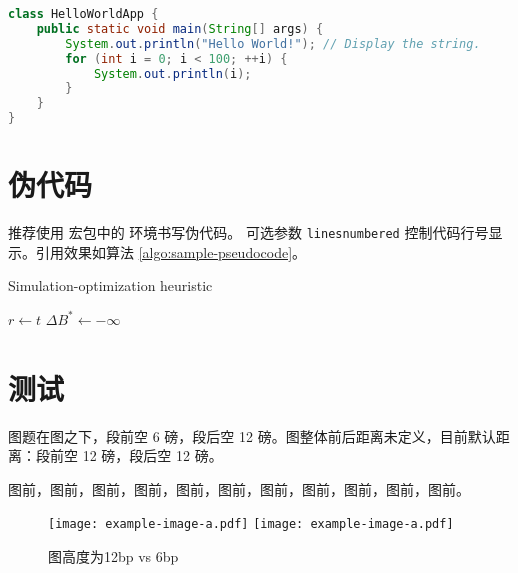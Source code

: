 \noindent%
\begin{minipage}{\linewidth}
\begin{lstlisting}[language=java,caption={Java 代码示例（使用 \pkg{listings} 高亮）},xleftmargin=20pt,label={lst:sample-code-listings}]
class HelloWorldApp {
    public static void main(String[] args) {
        System.out.println("Hello World!"); // Display the string.
        for (int i = 0; i < 100; ++i) {
            System.out.println(i);
        }
    }
}
\end{lstlisting}
\end{minipage}

\section{伪代码}


推荐使用  宏包中的  环境书写伪代码。 可选参数 \verb|linesnumbered| 控制代码行号显示。引用效果如算法 \ref{algo:sample-pseudocode}。

\begin{algorithm}
  \caption{Simulation-optimization heuristic}
  \label{algo:sample-pseudocode}
  $r\leftarrow t$\;
  $\Delta B^{\ast}\leftarrow -\infty$\;
\end{algorithm}

\newpage
\section{测试}

图题在图之下，段前空 6 磅，段后空 12 磅。图整体前后距离未定义，目前默认距离：段前空 12 磅，段后空 12 磅。

图前，图前，图前，图前，图前，图前，图前，图前，图前，图前，图前。

\begin{figure}[htbp]
  \centering
  \texttt{[image: example-image-a.pdf]}\hspace*{6bp}
  \texttt{[image: example-image-a.pdf]}
  \caption{图高度为12bp vs 6bp}
\end{figure}

